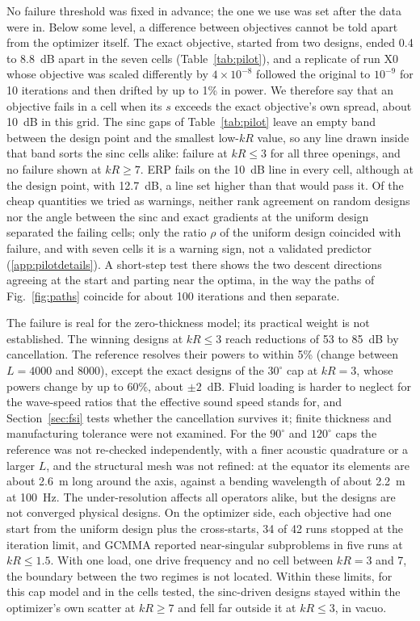 \documentclass[preprint,12pt]{elsarticle}
\begin{document}
No failure threshold was fixed in advance; the one we use was set after the data were in. Below some level, a difference between objectives cannot be told apart from the optimizer itself. The exact objective, started from two designs, ended 0.4 to 8.8~dB apart in the seven cells (Table~\ref{tab:pilot}), and a replicate of run X0 whose objective was scaled differently by $4\times10^{-8}$ followed the original to $10^{-9}$ for 10 iterations and then drifted by up to 1\% in power. %
We therefore say that an objective fails in a cell when its $s$ exceeds the exact objective's own spread, about 10~dB in this grid. The sinc gaps of Table~\ref{tab:pilot} leave an empty band between the design point and the smallest low-$kR$ value, so any line drawn inside that band sorts the sinc cells alike: failure at $kR\le3$ for all three openings, and no failure shown at $kR\ge7$. %
ERP fails on the 10~dB line in every cell, although at the design point, with 12.7~dB, a line set higher than that would pass it.
Of the cheap quantities we tried as warnings, neither rank agreement on random designs nor the angle between the sinc and exact gradients at the uniform design separated the failing cells; only the ratio $\rho$ of the uniform design coincided with failure, and with seven cells it is a warning sign, not a validated predictor (\ref{app:pilotdetails}). A short-step test there shows the two descent directions agreeing at the start and parting near the optima, in the way the paths of Fig.~\ref{fig:paths} coincide for about 100 iterations and then separate.

The failure is real for the zero-thickness model; its practical weight is not established. The winning designs at $kR\le3$ reach reductions of 53 to 85~dB by cancellation. %
The reference resolves their powers to within 5\% (change between $L=4000$ and 8000), except the exact designs of the $30^\circ$ cap at $kR=3$, whose powers change by up to 60\%, about $\pm2$~dB. %
Fluid loading is harder to neglect for the wave-speed ratios that the effective sound speed stands for, and Section~\ref{sec:fsi} tests whether the cancellation survives it; finite thickness and manufacturing tolerance were not examined. For the $90^\circ$ and $120^\circ$ caps the reference was not re-checked independently, with a finer acoustic quadrature or a larger $L$, and the structural mesh was not refined: at the equator its elements are about 2.6~m long around the axis, against a bending wavelength of about 2.2~m at 100~Hz. The under-resolution affects all operators alike, but the designs are not converged physical designs. %
On the optimizer side, each objective had one start from the uniform design plus the cross-starts, 34 of 42 runs stopped at the iteration limit, and GCMMA reported near-singular subproblems in five runs at $kR\le1.5$. %
With one load, one drive frequency and no cell between $kR=3$ and 7, the boundary between the two regimes is not located. Within these limits, for this cap model and in the cells tested, the sinc-driven designs stayed within the optimizer's own scatter at $kR\ge7$ and fell far outside it at $kR\le3$, in vacuo.
\end{document}
